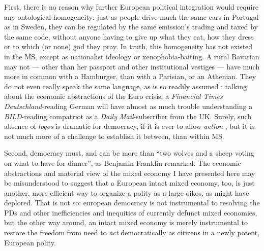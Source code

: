 \documentclass[11pt,a4paper,oneside,openright]{article}
\begin{document}
First, there is no reason why further European political integration would require any ontological homogeneity: 
just as people drive much the same cars in Portugal as in Sweden, they can be regulated by the same emission's trading and taxed by the same code, without anyone having to give up what they eat, how they dress or to which (or none) god they pray. 
In truth, this homogeneity has not existed in the \gls{MS}, except as nationalist ideology or xenophobia-baiting. 
A rural Bavarian may not --- other than her passport and other institutional vestiges --- have much more in common with a Hamburger, than with a Parisian, or an Athenian. 
They do not even really speak the same language, as is so readily assumed \citep{Kymlicka-2001-aa}: 
talking about the economic abstractions of the Euro crisis, a \emph{Financial Times Deutschland}-reading German will have almost as much trouble understanding a \emph{BILD}-reading compatriot as a \emph{Daily Mail}-subscriber from the UK. 
Surely, such absence of \emph{logos} is dramatic for democracy, if it is ever to allow \emph{action} \citep{Ahrendt1958}, but it is not much more of a challenge to establish it between, than within \gls{MS}.

Second, democracy must, and can be more than ``two wolves and a sheep voting on what to have for dinner'', as Benjamin Franklin remarked. 
The economic abstractions and material view of the mixed economy I have presented here may be misunderstood to suggest that a European intact mixed economy, too, is just another, more efficient way to organize a polity as a large oikos, as \citeauthor{Ahrendt1958} might have deplored. 
That is not so: 
european democracy is not instrumental to resolving the \glspl{PD} and other inefficiencies and inequities of currently defunct mixed economies, but the other way around, an intact mixed economy is merely instrumental to restore the freedom from need to \emph{act} democratically as citizens in a newly potent, European polity.


\end{document}
